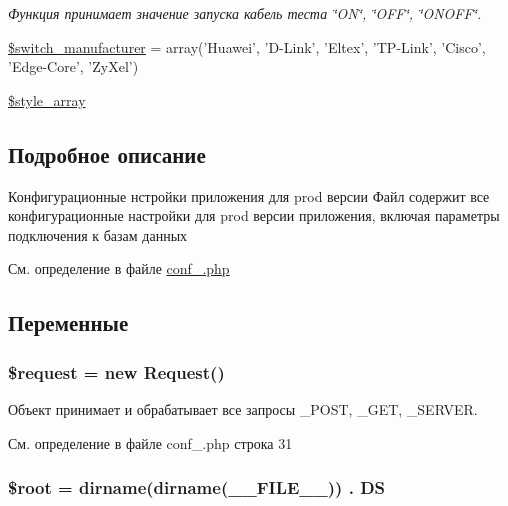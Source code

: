 \begin{DoxyCompactItemize}
\begin{DoxyCompactList}\small\item\em Функция принимает значение запуска кабель теста \char`\"{}\-O\-N\char`\"{}, \char`\"{}\-O\-F\-F\char`\"{}, \char`\"{}\-O\-N\-O\-F\-F\char`\"{}. \end{DoxyCompactList}\item 
\hyperlink{group__switch__manufacturer_ga2b1ea6f804c1caa0c3e824412fe37b16}{\$switch\-\_\-manufacturer} = array('Huawei', 'D-\/Link', 'Eltex', 'T\-P-\/Link', 'Cisco', 'Edge-\/Core', 'Zy\-Xel')
\item 
\hyperlink{group__styles_ga3af2130ca49d5b6d94c67af0775e6a0b}{\$style\-\_\-array}
\end{DoxyCompactItemize}


\subsection{Подробное описание}
Конфигурационные нстройки приложения для prod версии Файл содержит все конфигурационные настройки для prod версии приложения, включая параметры подключения к базам данных 

См. определение в файле \hyperlink{conf___8php_source}{conf\-\_\-.\-php}



\subsection{Переменные}
\hypertarget{conf___8php_abb35c8495a232b510389fa6d7b15d38a}{
\subsubsection[{\$request}]{\setlength{\rightskip}{0pt plus 5cm}\$request = new {\bf Request}()}}\label{conf___8php_abb35c8495a232b510389fa6d7b15d38a}


Объект принимает и обрабатывает все запросы \-\_\-\-P\-O\-S\-T, \-\_\-\-G\-E\-T, \-\_\-\-S\-E\-R\-V\-E\-R. 



См. определение в файле conf\-\_\-.\-php строка 31

\hypertarget{conf___8php_ab37f7c32f41c3c61ed940887453767f4}{
\subsubsection[{\$root}]{\setlength{\rightskip}{0pt plus 5cm}\$root = dirname(dirname(\-\_\-\-\_\-\-F\-I\-L\-E\-\_\-\-\_\-)) . {\bf D\-S}}}\label{conf___8php_ab37f7c32f41c3c61ed940887453767f4}


